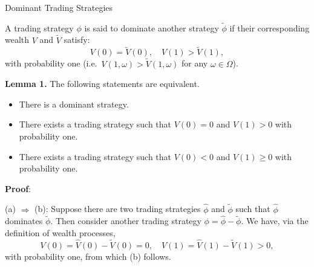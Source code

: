 \documentclass{beamer}
\begin{document}
\begin{frame}{Dominant Trading Strategies}

    {\footnotesize \footnotesize
    
    A trading strategy \(\phi\) is said to dominate another strategy \(\tilde{\phi}\) if their corresponding wealth \(V\) and \(\tilde{V}\) satisfy:
    \[
    V(0) = \tilde{V}(0),\quad V(1) > \tilde{V}(1),
    \]
    with probability one (i.e.\ \(V(1, \omega) > \tilde{V}(1, \omega)\) for any \(\omega \in \Omega\)).
    \vspace{1em}
    \par \textbf{Lemma 1.} The following statements are equivalent.
    \begin{itemize}
        \item There is a dominant strategy.
        \item There exists a trading strategy such that \(V(0) = 0\) and \(V(1) > 0\) with probability one.
        \item There exists a trading strategy such that \(V(0) < 0\) and \(V(1) \geq 0\) with probability one.
    \end{itemize}
    \par \textbf{Proof}:
    \par (a) \(\Rightarrow\) (b): Suppose there are two trading strategies \(\hat{\phi}\) and \(\tilde{\phi}\) such that \(\hat{\phi}\) dominates \(\tilde{\phi}\). Then consider another trading strategy \(\phi = \hat{\phi} - \tilde{\phi}\). We have, via the definition of wealth processes,
    \[
    V(0) = \hat{V}(0) - \tilde{V}(0) = 0,\quad V(1) = \hat{V}(1) - \tilde{V}(1) > 0,
    \]
    with probability one, from which (b) follows.
    }
\end{frame}
\end{document}
